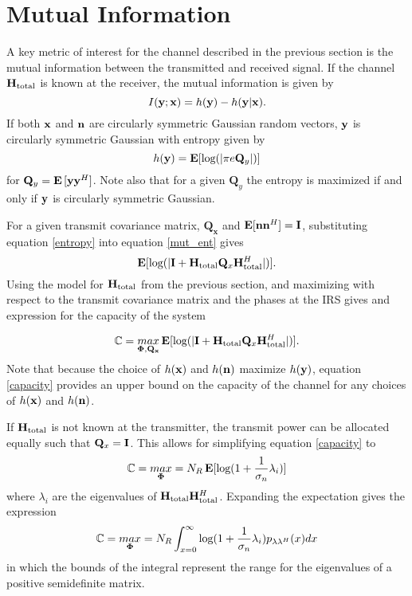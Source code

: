 \documentclass[12pt,a4paper]{report}
\begin{document}
\section{Mutual Information}\label{sectiond:mut_info}
A key metric of interest for the channel described in the previous section is the mutual information between the transmitted and received signal. If the channel $\mathbf{H}_\text{total}$ is known at the receiver, the mutual information is given by 
\begin{equation}\label{mut_ent}
I(\mathbf{y};\mathbf{x}) = h(\mathbf{y}) - h(\mathbf{y}|\mathbf{x}).
\end{equation}
If both $\mathbf{x}$ and $\mathbf{n}$ are circularly symmetric Gaussian random vectors, $\mathbf{y}$ is circularly symmetric Gaussian with entropy given by \cite{telatar1999capacity} 
\begin{equation}\label{entropy}
h(\mathbf{y}) = \mathop{\bf E{}}[\text{log{}}(|\pi e \mathbf{Q}_{y}|)]
\end{equation}
 for $\mathbf{Q}_{y} = \mathop{\bf E{}}{[\mathbf{y} \mathbf{y}^H]}$. Note also that for a given $\mathbf{Q}_{y}$ the entropy is maximized if and only if $\mathbf{y}$ is circularly symmetric Gaussian.

For a given transmit covariance matrix, $\mathbf{Q_x}$ and $\mathop{\bf E{}}[\mathbf{n}\mathbf{n}^H] = \mathbf{I}$, substituting equation \eqref{entropy} into equation
\eqref{mut_ent} gives
\begin{equation}\label{mut_inf}
\mathop{\bf E{}} [\text{log{}}(|\mathbf{I} + \mathbf{H}_\text{total} \mathbf{Q}_x \mathbf{H}_\text{total}^H|)].
\end{equation}
Using the model for $\mathbf{H}_\text{total}$ from the previous section, and maximizing with respect to the
transmit covariance matrix and the phases at the IRS gives and expression for the capacity of the system

\begin{equation}\label{capacity}
\mathbb{C} = \underset{\boldsymbol{\Phi},\mathbf{Q_x}}{\mathop{max}} \mathop{\bf E{}} [\text{log{}}(|\mathbf{I} + \mathbf{H}_\text{total} \mathbf{Q}_x \mathbf{H}_\text{total}^H|)].
\end{equation}
Note that because the choice of $h(\mathbf{x}) $ and $h(\mathbf{n})$ maximize $h(\mathbf{y})$, equation \eqref{capacity} provides an upper bound on the capacity of the channel for any choices of $h(\mathbf{x}) $ and $h(\mathbf{n})$.

If $\mathbf{H}_\text{total}$ is not known at the transmitter, the transmit power can be allocated
equally such that $\mathbf{Q}_x = \mathbf{I}$. This allows for simplifying equation \eqref{capacity} to 
\begin{equation}\label{no_csi_capacity}
\mathbb{C} = \underset{\boldsymbol{\Phi}}{\mathop{max}} = N_R \mathop{\bf E{}}[\text{log{}}(1 + \frac{1}{\sigma_n}\lambda_i)]
\end{equation}
where $\lambda_i$ are the eigenvalues of $\mathbf{H}_\text{total} \mathbf{H}_\text{total}^H$.
Expanding the expectation gives the expression
\begin{equation}\label{no_csi_capacity_aed}
\mathbb{C} = \underset{\boldsymbol{\Phi}}{\mathop{max}} = N_R  \int_{x=0}^{\infty}\text{log{}}(1 + \frac{1}{\sigma_n}\lambda_i)p_{\lambda\lambda^H}(x) dx
\end{equation}
in which the bounds of the integral represent the range for the eigenvalues of a positive semidefinite matrix. 
\end{document}

